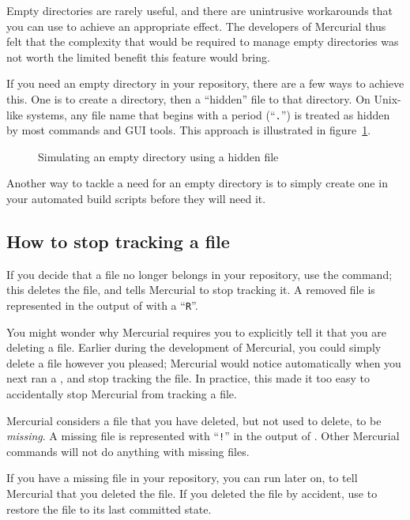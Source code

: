 Empty directories are rarely useful, and there are unintrusive
workarounds that you can use to achieve an appropriate effect.  The
developers of Mercurial thus felt that the complexity that would be
required to manage empty directories was not worth the limited benefit
this feature would bring.

If you need an empty directory in your repository, there are a few
ways to achieve this. One is to create a directory, then  a
``hidden'' file to that directory.  On Unix-like systems, any file
name that begins with a period (``\texttt{.}'') is treated as hidden
by most commands and GUI tools.  This approach is illustrated in
figure~\ref{ex:daily:hidden}.

\begin{figure}[ht]
  \caption{Simulating an empty directory using a hidden file}
  \label{ex:daily:hidden}
\end{figure}

Another way to tackle a need for an empty directory is to simply
create one in your automated build scripts before they will need it.

\subsection{How to stop tracking a file}

If you decide that a file no longer belongs in your repository, use
the  command; this deletes the file, and tells Mercurial
to stop tracking it.  A removed file is represented in the output of
 with a ``\texttt{R}''.

You might wonder why Mercurial requires you to explicitly tell it that
you are deleting a file.  Earlier during the development of Mercurial,
you could simply delete a file however you pleased; Mercurial would
notice automatically when you next ran a , and stop
tracking the file.  In practice, this made it too easy to accidentally
stop Mercurial from tracking a file.

Mercurial considers a file that you have deleted, but not used
 to delete, to be \emph{missing}.  A missing file is
represented with ``\texttt{!}'' in the output of .
Other Mercurial commands will not do anything with missing files.

If you have a missing file in your repository, you can run
 later on, to tell
Mercurial that you deleted the file.  If you deleted the file by
accident, use  to restore the file
to its last committed state.

